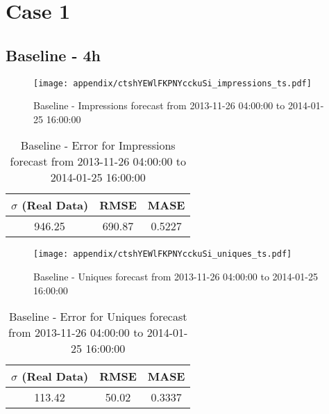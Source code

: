 \chapter{Case 1}\label{ap:case1}

\section{Baseline - 4h}
\begin{figure}[H] \begin{center} \leavevmode
\texttt{[image: appendix/ctshYEWlFKPNYcckuSi\_impressions\_ts.pdf]} \caption{
Baseline - Impressions forecast from 2013-11-26 04:00:00 to 2014-01-25 16:00:00} \label{fig:appendix/ctshYEWlFKPNYcckuSi_impressions_ts.pdf} \end{center}
\end{figure}

\begin{table}[H]
\centering
\footnotesize
\begin{tabular}{ccc}
$\sigma$ (Real Data) & RMSE & MASE   \\ \hline
946.25 & 690.87 & 0.5227 \\
\end{tabular}

\vspace{0.5cm}

\caption{
Baseline - Error for Impressions forecast from 2013-11-26 04:00:00 to 2014-01-25 16:00:00}
\end{table}

\begin{figure}[H] \begin{center} \leavevmode
\texttt{[image: appendix/ctshYEWlFKPNYcckuSi\_uniques\_ts.pdf]} \caption{
Baseline - Uniques forecast from 2013-11-26 04:00:00 to 2014-01-25 16:00:00} \label{fig:appendix/ctshYEWlFKPNYcckuSi_uniques_ts.pdf} \end{center}
\end{figure}

\begin{table}[H]
\centering
\footnotesize
\begin{tabular}{ccc}
$\sigma$ (Real Data) & RMSE & MASE   \\ \hline
113.42 & 50.02 & 0.3337 \\
\end{tabular}

\vspace{0.5cm}

\caption{
Baseline - Error for Uniques forecast from 2013-11-26 04:00:00 to 2014-01-25 16:00:00}
\end{table}

